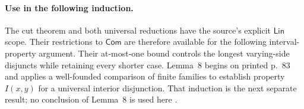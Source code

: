 \paragraph{Use in the following induction.}
The cut theorem and both universal reductions have the source's explicit
\(\mathsf{Lin}\) scope. Their restrictions to \(\mathsf{Com}\)
are therefore available for the following interval-property argument.
Their at-most-one bound controls the longest varying-side disjuncts
while retaining every shorter case. Lemma~8 begins on printed p.~83 and applies a
well-founded comparison of finite families to establish property
\(I(x,y)\) for a universal interior disjunction. That induction is
the next separate result; no conclusion of Lemma~8 is used here
\cite[ch.~III, pp.~83--84]{Kamp1968}.
